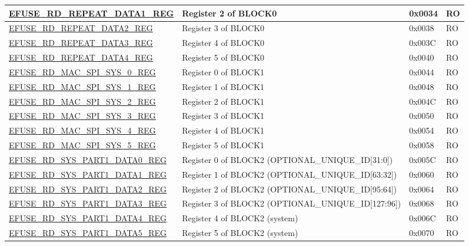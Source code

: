 \begin{longtable}{ | p{6.8cm} | p{7cm} | p{1.3cm} | p{1.2cm} | }
\hyperref[regdesc:EFUSERDREPEATDATA1REG]{EFUSE\_RD\_REPEAT\_DATA1\_REG} & Register 2 of BLOCK0 & 0x0034 & RO \\ \hline
\hyperref[regdesc:EFUSERDREPEATDATA2REG]{EFUSE\_RD\_REPEAT\_DATA2\_REG} & Register 3 of BLOCK0 & 0x0038 & RO \\ \hline
\hyperref[regdesc:EFUSERDREPEATDATA3REG]{EFUSE\_RD\_REPEAT\_DATA3\_REG} & Register 4 of BLOCK0 & 0x003C & RO \\ \hline
\hyperref[regdesc:EFUSERDREPEATDATA4REG]{EFUSE\_RD\_REPEAT\_DATA4\_REG} & Register 5 of BLOCK0 & 0x0040 & RO \\ \hline
\hyperref[regdesc:EFUSERDMACSPISYS0REG]{EFUSE\_RD\_MAC\_SPI\_SYS\_0\_REG} & Register 0 of BLOCK1 & 0x0044 & RO \\ \hline
\hyperref[regdesc:EFUSERDMACSPISYS1REG]{EFUSE\_RD\_MAC\_SPI\_SYS\_1\_REG} & Register 1 of BLOCK1 & 0x0048 & RO \\ \hline
\hyperref[regdesc:EFUSERDMACSPISYS2REG]{EFUSE\_RD\_MAC\_SPI\_SYS\_2\_REG} & Register 2 of BLOCK1 & 0x004C & RO \\ \hline
\hyperref[regdesc:EFUSERDMACSPISYS3REG]{EFUSE\_RD\_MAC\_SPI\_SYS\_3\_REG} & Register 3 of BLOCK1 & 0x0050 & RO \\ \hline
\hyperref[regdesc:EFUSERDMACSPISYS4REG]{EFUSE\_RD\_MAC\_SPI\_SYS\_4\_REG} & Register 4 of BLOCK1 & 0x0054 & RO \\ \hline
\hyperref[regdesc:EFUSERDMACSPISYS5REG]{EFUSE\_RD\_MAC\_SPI\_SYS\_5\_REG} & Register 5 of BLOCK1 & 0x0058 & RO \\ \hline
\hyperref[regdesc:EFUSERDSYSPART1DATA0REG]{EFUSE\_RD\_SYS\_PART1\_DATA0\_REG} & Register 0 of BLOCK2 (OPTIONAL\_UNIQUE\_ID[31:0]) & 0x005C & RO \\ \hline
\hyperref[regdesc:EFUSERDSYSPART1DATA1REG]{EFUSE\_RD\_SYS\_PART1\_DATA1\_REG} & Register 1 of BLOCK2 (OPTIONAL\_UNIQUE\_ID[63:32]) & 0x0060 & RO \\ \hline
\hyperref[regdesc:EFUSERDSYSPART1DATA2REG]{EFUSE\_RD\_SYS\_PART1\_DATA2\_REG} & Register 2 of BLOCK2 (OPTIONAL\_UNIQUE\_ID[95:64]) & 0x0064 & RO \\ \hline
\hyperref[regdesc:EFUSERDSYSPART1DATA3REG]{EFUSE\_RD\_SYS\_PART1\_DATA3\_REG} & Register 3 of BLOCK2 (OPTIONAL\_UNIQUE\_ID[127:96]) & 0x0068 & RO \\ \hline
\hyperref[regdesc:EFUSERDSYSPART1DATA4REG]{EFUSE\_RD\_SYS\_PART1\_DATA4\_REG} & Register 4 of BLOCK2 (system) & 0x006C & RO \\ \hline
\hyperref[regdesc:EFUSERDSYSPART1DATA5REG]{EFUSE\_RD\_SYS\_PART1\_DATA5\_REG} & Register 5 of BLOCK2 (system) & 0x0070 & RO \\ \hline

\end{longtable}
